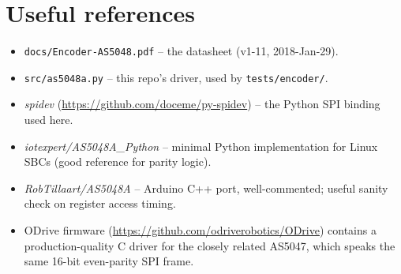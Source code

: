 \documentclass[11pt,a4paper]{article}
\begin{document}
\section{Useful references}
\begin{itemize}
  \item \texttt{docs/Encoder-AS5048.pdf} -- the datasheet
        (v1-11, 2018-Jan-29).
  \item \texttt{src/as5048a.py} -- this repo's driver, used by
        \texttt{tests/encoder/}.
  \item \emph{spidev} (\url{https://github.com/doceme/py-spidev}) --
        the Python SPI binding used here.
  \item \emph{iotexpert/AS5048A\_Python} -- minimal Python implementation
        for Linux SBCs (good reference for parity logic).
  \item \emph{RobTillaart/AS5048A} -- Arduino C++ port, well-commented;
        useful sanity check on register access timing.
  \item ODrive firmware (\url{https://github.com/odriverobotics/ODrive})
        contains a production-quality C driver for the closely related
        AS5047, which speaks the same 16-bit even-parity SPI frame.
\end{itemize}
\end{document}

